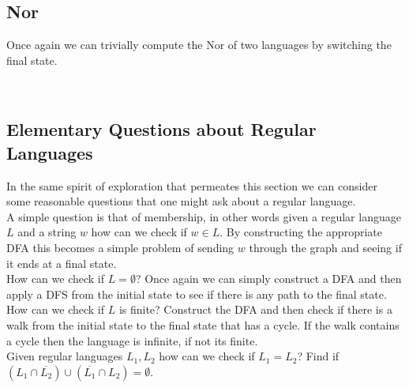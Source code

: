 \documentclass[11pt]{exam}
\begin{document}
\subsection{Nor}
Once again we can trivially compute the Nor of two languages by switching the final state.
\\

\subsection{Elementary Questions about Regular Languages}

In the same spirit of exploration that permeates this section we can consider some reasonable questions that one might ask about a regular language.\\

A simple question is that of membership, in other words given a regular language $L$ and a string $w$ how can we check if $w \in L$. By constructing the appropriate DFA this becomes a simple problem of sending $w$ through the graph and seeing if it ends at a final state.\\

How can we check if $L = \emptyset$? Once again we can simply construct a DFA and then apply a DFS from the initial state to see if there is any path to the final state.\\

How can we check if $L$ is finite? Construct the DFA and then check if there is a walk from the initial state to the final state that has a cycle. If the walk contains a cycle then the language is infinite, if not its finite.\\

Given regular languages $L_1,L_2$ how can we check if $L_1 = L_2$? Find if $(L_1 \cap \overline{L_2}) \cup (\overline{L_1} \cap L_2) = \emptyset$.
 
\end{document}
